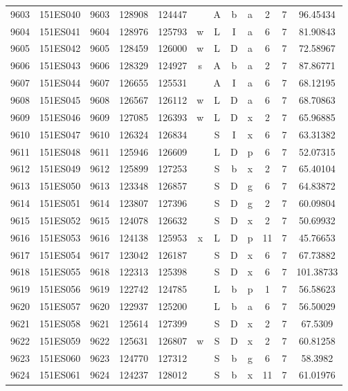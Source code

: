 \begin{tabular}{|*{12}{c|}}
9603 & 151ES040 & 9603 & 128908 & 124447 &  & A & b & a & 2 & 7 & 96.45434 \\ 
9604 & 151ES041 & 9604 & 128976 & 125793 & w & L & I & a & 6 & 7 & 81.90843 \\ 
9605 & 151ES042 & 9605 & 128459 & 126000 & w & L & D & a & 6 & 7 & 72.58967 \\ 
9606 & 151ES043 & 9606 & 128329 & 124927 & s & A & b & a & 2 & 7 & 87.86771 \\ 
9607 & 151ES044 & 9607 & 126655 & 125531 &  & A & I & a & 6 & 7 & 68.12195 \\ 
9608 & 151ES045 & 9608 & 126567 & 126112 & w & L & D & a & 6 & 7 & 68.70863 \\ 
9609 & 151ES046 & 9609 & 127085 & 126393 & w & L & D & x & 2 & 7 & 65.96885 \\ 
9610 & 151ES047 & 9610 & 126324 & 126834 &  & S & I & x & 6 & 7 & 63.31382 \\ 
9611 & 151ES048 & 9611 & 125946 & 126609 &  & L & D & p & 6 & 7 & 52.07315 \\ 
9612 & 151ES049 & 9612 & 125899 & 127253 &  & S & b & x & 2 & 7 & 65.40104 \\ 
9613 & 151ES050 & 9613 & 123348 & 126857 &  & S & D & g & 6 & 7 & 64.83872 \\ 
9614 & 151ES051 & 9614 & 123807 & 127396 &  & S & D & g & 2 & 7 & 60.09804 \\ 
9615 & 151ES052 & 9615 & 124078 & 126632 &  & S & D & x & 2 & 7 & 50.69932 \\ 
9616 & 151ES053 & 9616 & 124138 & 125953 & x & L & D & p & 11 & 7 & 45.76653 \\ 
9617 & 151ES054 & 9617 & 123042 & 126187 &  & S & D & x & 6 & 7 & 67.73882 \\ 
9618 & 151ES055 & 9618 & 122313 & 125398 &  & S & D & x & 6 & 7 & 101.38733 \\ 
9619 & 151ES056 & 9619 & 122742 & 124785 &  & L & b & p & 1 & 7 & 56.58623 \\ 
9620 & 151ES057 & 9620 & 122937 & 125200 &  & L & b & a & 6 & 7 & 56.50029 \\ 
9621 & 151ES058 & 9621 & 125614 & 127399 &  & S & D & x & 2 & 7 & 67.5309 \\ 
9622 & 151ES059 & 9622 & 125631 & 126807 & w & S & D & x & 2 & 7 & 60.81258 \\ 
9623 & 151ES060 & 9623 & 124770 & 127312 &  & S & b & g & 6 & 7 & 58.3982 \\ 
9624 & 151ES061 & 9624 & 124237 & 128012 &  & S & b & x & 11 & 7 & 61.01976 \\ 

\end{tabular}
